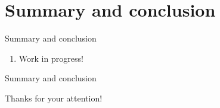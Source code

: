 \documentclass{beamer}
\begin{document}
\section{Summary and conclusion}
\begin{frame}{Summary and conclusion}
  \begin{enumerate}
    \setlength\itemsep{1.0em}
    \item{Work in progress!}
  \end{enumerate}
\end{frame}

\begin{frame}{Summary and conclusion}
  \begin{center}
    {\huge Thanks for your attention!}
  \end{center}
\end{frame}
\end{document}
